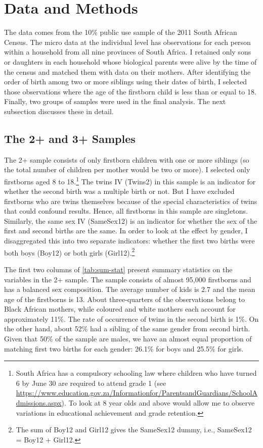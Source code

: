 
\section{Data and Methods}
\label{section:data}

The data comes from the 10\% public use sample of the 2011 South African Census. The micro data at the individual level has observations for each person within a household from all nine provinces of South Africa. I retained only sons or daughters in each household whose biological parents were alive by the time of the census and matched them with data on their mothers. After identifying the order of birth among two or more siblings using their dates of birth, I selected those observations where the age of the firstborn child is less than or equal to 18. Finally, two groups of samples were used in the final analysis. The next subsection discusses these in detail.

\subsection{The 2+ and 3+ Samples}

The 2+ sample consists of only firstborn children with one or more siblings (so the total number of children per mother would be two or more). I selected only firstborns aged 8 to 18.\footnote{ South Africa has a compulsory schooling law where children who have turned 6 by June 30 are required to attend grade 1 (see \url{https://www.education.gov.za/Informationfor/ParentsandGuardians/SchoolAdmissions.aspx}). To look at 8 year olds and above would allow me to observe variations in educational achievement and grade retention. }  The twins IV (Twins2) in this sample is an indicator for whether the second birth was a multiple birth or not. But I have excluded firstborns who are twins themselves because of the special characteristics of twins that could confound results. Hence, all firstborns in this sample are singletons. Similarly, the same sex IV (SameSex12) is an indicator for whether the sex of the first and second births are the same. In order to look at the effect by gender, I disaggregated this into two separate indicators: whether the first two births were both boys (Boy12) or both girls (Girl12).\footnote{ The sum of Boy12 and Girl12 gives the SameSex12 dummy, i.e., SameSex12 = Boy12 + Girl12. }  



The first two columns of \autoref{tab:sum-stat} present summary statistics on the variables in the 2+ sample. The sample consists of almost 95,000 firstborns and has a balanced sex composition. The average number of kids is 2.7 and the mean age of the firstborns is 13. About three-quarters of the observations belong to Black African mothers, while coloured and white mothers each account for approximately 11\%. The rate of occurrence of twins in the second birth is 1\%. On the other hand, about 52\% had a sibling of the same gender from second birth. Given that 50\% of the sample are males, we have an almost equal proportion of matching first two births for each gender: 26.1\% for boys and 25.5\% for girls. 

